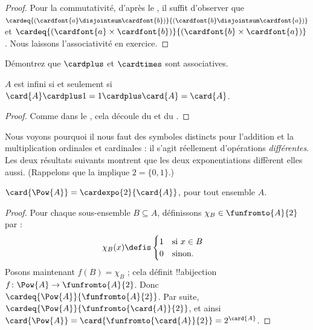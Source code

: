\documentclass[../../../include/open-logic-section]{subfiles}
\begin{document}
\begin{proof}
Pour la commutativité, d'après le
,
il suffit d'observer que
$\cardeq{(\cardfont{a} \disjointsum
\cardfont{b})}{(\cardfont{b} \disjointsum \cardfont{a})}$
et
$\cardeq{(\cardfont{a} \times \cardfont{b})}
{(\cardfont{b} \times \cardfont{a})}$.
Nous laissons l'associativité en exercice.
\end{proof}

\begin{prob}
Démontrez que $\cardplus$ et $\cardtimes$ sont associatives.
\end{prob}

\begin{prop}
$A$ est infini si et seulement si
$\card{A} \cardplus 1 = 1 \cardplus \card{A} = \card{A}$.
\end{prop}

\begin{proof}
Comme dans le
,
cela découle du
et du .
\end{proof}

Nous voyons pourquoi il nous faut des symboles distincts
pour l'addition et la multiplication ordinales et cardinales :
il s'agit réellement d'opérations \emph{différentes}.
Les deux résultats suivants montrent que les deux
exponentiations diffèrent elles aussi.
(Rappelons que la 
implique $2 = \{0, 1\}$.) 

\begin{lem}
$\card{\Pow{A}} = \cardexpo{2}{\card{A}}$,
pour tout ensemble $A$.
\end{lem}

\begin{proof}
Pour chaque sous-ensemble $B \subseteq A$,
définissons $\chi_B \in \funfromto{A}{2}$ par :
\begin{align*}
	\chi_{B}(x) &\defis
	\begin{cases}
		1 & \text{si }x\in B\\
		0 & \text{sinon.}
	\end{cases}
\end{align*}
Posons maintenant $f(B) = \chi_B$ ; cela définit
!!a{bijection} $f \colon \Pow{A}
\to \funfromto{A}{2}$. Donc
$\cardeq{\Pow{A}}{\funfromto{A}{2}}$.
Par suite,
$\cardeq{\Pow{A}}{\funfromto{\card{A}}{2}}$,
et ainsi
$\card{\Pow{A}} = \card{\funfromto{\card{A}}{2}}
= 2^{\card{A}}$.
\end{proof}
\end{document}

